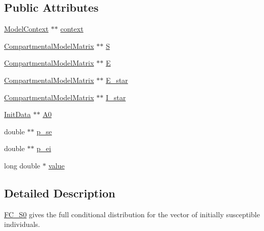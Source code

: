 \subsection*{Public Attributes}
\begin{DoxyCompactItemize}
\item 
\hyperlink{classSpatialSEIR_1_1ModelContext}{Model\-Context} $\ast$$\ast$ \hyperlink{classSpatialSEIR_1_1FC__S0_a83166c2c9ee448358d1e7f2e4984cdc1}{context}
\item 
\hyperlink{classSpatialSEIR_1_1CompartmentalModelMatrix}{Compartmental\-Model\-Matrix} $\ast$$\ast$ \hyperlink{classSpatialSEIR_1_1FC__S0_aaed79f1e5bb2d4b08bc70d1fb71429a9}{S}
\item 
\hyperlink{classSpatialSEIR_1_1CompartmentalModelMatrix}{Compartmental\-Model\-Matrix} $\ast$$\ast$ \hyperlink{classSpatialSEIR_1_1FC__S0_a1ac3fa597eddcde3c6669d823a20c405}{E}
\item 
\hyperlink{classSpatialSEIR_1_1CompartmentalModelMatrix}{Compartmental\-Model\-Matrix} $\ast$$\ast$ \hyperlink{classSpatialSEIR_1_1FC__S0_a4cfa26dfb15450d2a222bcfee37cc35c}{E\-\_\-star}
\item 
\hyperlink{classSpatialSEIR_1_1CompartmentalModelMatrix}{Compartmental\-Model\-Matrix} $\ast$$\ast$ \hyperlink{classSpatialSEIR_1_1FC__S0_a89165d891584534f202f4ecc542bb920}{I\-\_\-star}
\item 
\hyperlink{classSpatialSEIR_1_1InitData}{Init\-Data} $\ast$$\ast$ \hyperlink{classSpatialSEIR_1_1FC__S0_a96ec8ecdc6bd2f9e86122c989e743245}{A0}
\item 
double $\ast$$\ast$ \hyperlink{classSpatialSEIR_1_1FC__S0_a04201525ed952cf56753fdd9a9701596}{p\-\_\-se}
\item 
double $\ast$$\ast$ \hyperlink{classSpatialSEIR_1_1FC__S0_a10210c8d2303327f2ba2646e298e75d4}{p\-\_\-ei}
\item 
long double $\ast$ \hyperlink{classSpatialSEIR_1_1FC__S0_af2c8815ba97a77505a0851c36dc164f5}{value}
\end{DoxyCompactItemize}


\subsection{Detailed Description}
\hyperlink{classSpatialSEIR_1_1FC__S0}{F\-C\-\_\-\-S0} gives the full conditional distribution for the vector of initially susceptible individuals. 

